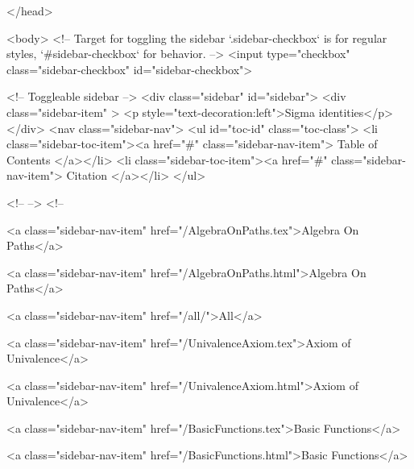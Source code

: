   
</head>




  <body>
    <!-- Target for toggling the sidebar `.sidebar-checkbox` is for regular
     styles, `#sidebar-checkbox` for behavior. -->
<input type="checkbox" class="sidebar-checkbox" id="sidebar-checkbox">

<!-- Toggleable sidebar -->
<div class="sidebar" id="sidebar">
  <div class="sidebar-item" >
    <p style="text-decoration:left">Sigma identities</p>
  </div>
  <nav class="sidebar-nav">
    <ul id="toc-id" class="toc-class">
  <li class="sidebar-toc-item"><a href="#" class="sidebar-nav-item"> Table of Contents </a></li>
  <li class="sidebar-toc-item"><a href="#" class="sidebar-nav-item"> Citation </a></li>
</ul>


    <!--  -->
    <!-- 
      
    
      
    
      
    
      
        
      
    
      
        
          <a class="sidebar-nav-item" href="/AlgebraOnPaths.tex">Algebra On Paths</a>
        
      
    
      
        
          <a class="sidebar-nav-item" href="/AlgebraOnPaths.html">Algebra On Paths</a>
        
      
    
      
        
          <a class="sidebar-nav-item" href="/all/">All</a>
        
      
    
      
        
          <a class="sidebar-nav-item" href="/UnivalenceAxiom.tex">Axiom of Univalence</a>
        
      
    
      
        
          <a class="sidebar-nav-item" href="/UnivalenceAxiom.html">Axiom of Univalence</a>
        
      
    
      
        
          <a class="sidebar-nav-item" href="/BasicFunctions.tex">Basic Functions</a>
        
      
    
      
        
          <a class="sidebar-nav-item" href="/BasicFunctions.html">Basic Functions</a>
        
